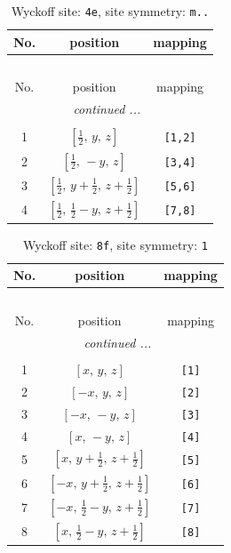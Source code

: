 \documentclass[fleqn,8pt]{jsarticle}
\begin{document}
\renewcommand{\arraystretch}{1.2}
\begin{longtable}{ccc}
\caption{Wyckoff site: {\tt 4e}, site symmetry: {\tt m..}}
 \\
 \hline \hline
No. & position & mapping \\ \hline \endfirsthead

\multicolumn{2}{l}{\tablename\ \thetable{}} \\
 \hline \hline
No. & position & mapping \\ \hline \endhead

 \hline \hline
\multicolumn{2}{r}{\footnotesize\it continued ...} \\ \endfoot

 \hline \hline
\multicolumn{2}{r}{} \\ \endlastfoot

1 & $\left[ \frac{1}{2},\, y,\, z \right]$ & {\tt [1,2]} \\ \hline
2 & $\left[ \frac{1}{2},\, - y,\, z \right]$ & {\tt [3,4]} \\ \hline
3 & $\left[ \frac{1}{2},\, y + \frac{1}{2},\, z + \frac{1}{2} \right]$ & {\tt [5,6]} \\ \hline
4 & $\left[ \frac{1}{2},\, \frac{1}{2} - y,\, z + \frac{1}{2} \right]$ & {\tt [7,8]} \\
\end{longtable}
\renewcommand{\arraystretch}{1.2}
\begin{longtable}{ccc}
\caption{Wyckoff site: {\tt 8f}, site symmetry: {\tt 1}}
 \\
 \hline \hline
No. & position & mapping \\ \hline \endfirsthead

\multicolumn{2}{l}{\tablename\ \thetable{}} \\
 \hline \hline
No. & position & mapping \\ \hline \endhead

 \hline \hline
\multicolumn{2}{r}{\footnotesize\it continued ...} \\ \endfoot

 \hline \hline
\multicolumn{2}{r}{} \\ \endlastfoot

1 & $\left[ x,\, y,\, z \right]$ & {\tt [1]} \\ \hline
2 & $\left[ - x,\, y,\, z \right]$ & {\tt [2]} \\ \hline
3 & $\left[ - x,\, - y,\, z \right]$ & {\tt [3]} \\ \hline
4 & $\left[ x,\, - y,\, z \right]$ & {\tt [4]} \\ \hline
5 & $\left[ x,\, y + \frac{1}{2},\, z + \frac{1}{2} \right]$ & {\tt [5]} \\ \hline
6 & $\left[ - x,\, y + \frac{1}{2},\, z + \frac{1}{2} \right]$ & {\tt [6]} \\ \hline
7 & $\left[ - x,\, \frac{1}{2} - y,\, z + \frac{1}{2} \right]$ & {\tt [7]} \\ \hline
8 & $\left[ x,\, \frac{1}{2} - y,\, z + \frac{1}{2} \right]$ & {\tt [8]} \\
\end{longtable}
\end{document}
